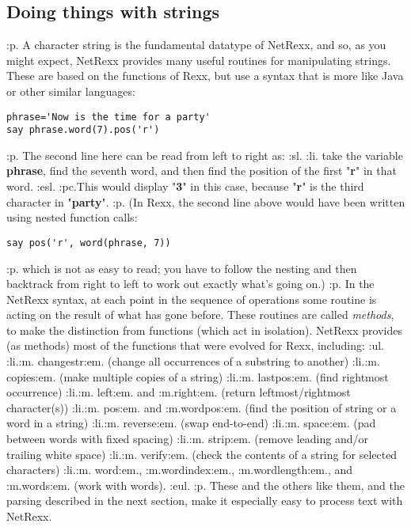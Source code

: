 \subsection{Doing things with strings}\label{refostrin}
:p.
A character string is the fundamental datatype of NetRexx, and so, as
you might expect, NetRexx provides many useful routines for manipulating
strings.  These are based on the functions of Rexx, but use a syntax
that is more like Java or other similar languages:
\begin{verbatim}
phrase='Now is the time for a party'
say phrase.word(7).pos('r')
\end{verbatim}
:p.
The second line here can be read from left to right as:
:sl.
:li.
take the variable \textbf{phrase}, find the seventh word, and then
find the position of the first "\textbf{r}" in that word.
:esl.
:pc.This would display "\textbf{3}" in this case, because
"\textbf{r}" is the third character in "\textbf{party}".
:p.
(In Rexx, the second line above would have been written using nested
function calls:
\begin{verbatim}
say pos('r', word(phrase, 7))
\end{verbatim}
:p.
which is not as easy to read; you have to follow the nesting and then
backtrack from right to left to work out exactly what's going on.)
:p.
In the NetRexx syntax, at each point in the sequence of operations some
routine is acting on the result of what has gone before.  These routines
are called \emph{methods}, to make the distinction from functions
(which act in isolation).  NetRexx provides (as methods) most of the
functions that were evolved for Rexx, including:
:ul.
:li.:m.
changestr:em. (change all occurrences of a substring to another)
:li.:m.
copies:em. (make multiple copies of a string)
:li.:m.
lastpos:em. (find rightmost occurrence)
:li.:m.
left:em. and :m.right:em. (return leftmost/rightmost character(s))
:li.:m.
pos:em. and :m.wordpos:em. (find the position of string or a word in a string)
:li.:m.
reverse:em. (swap end-to-end)
:li.:m.
space:em. (pad between words with fixed spacing)
:li.:m.
strip:em. (remove leading and/or trailing white space)
:li.:m.
verify:em. (check the contents of a string for selected characters)
:li.:m.
word:em., :m.wordindex:em., :m.wordlength:em., and :m.words:em. (work with words).
:eul.
:p.
These and the others like them, and the parsing described in the next
section, make it especially easy to process text with NetRexx.
